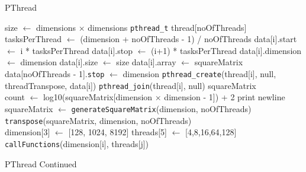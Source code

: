 \documentclass[10pt,twocolumn]{witseiepaper}
\begin{document}
\begin{appendix}
\begin{algorithm}[htbp]
\begin{algorithmic}
		\caption{PThread}
		\label{alg:3}
	\end{algorithmic}
\end{algorithm}

\begin{algorithm}[htbp]
	\begin{algorithmic}
		
		\State size $\leftarrow$ dimensions $\times$ dimensions
		\State \verb|pthread_t| thread[noOfThreads]
		\State tasksPerThread $\leftarrow$ (dimension + noOfThreads - 1) / noOfThreads
		\State data[i].start $\leftarrow$ i * tasksPerThread
		\State data[i].stop $\leftarrow$ (i+1) * tasksPerThread
		\State data[i].dimension $\leftarrow$ dimension
		\State data[i].size $\leftarrow$ size
		\State data[i].array $\leftarrow$ squareMatrix
		\EndFor
		\State data[noOfThreads - 1].\verb|stop| $\leftarrow$ dimension
		\State \verb|pthread_create|(thread[i], null, threadTranspose, data[i])
		\EndFor
		\State \verb|pthread_join|(thread[i], null)
		\EndFor
		\State \Return squareMatrix
		\EndFunction \\
		
		\State count $\leftarrow$ log10(squareMatrix[dimension $\times$ dimension - 1]) + 2
		\State print newline
		\EndIf
		\EndFor
		\EndFunction \\
		
		\State squareMatrix $\leftarrow$ \verb|generateSquareMatrix|(dimension, noOfThreads)
		\State \verb|transpose|(squareMatrix, dimension, noOfThreads)
		\EndFunction \\
		
		\State dimension[3] $\leftarrow$ [128, 1024, 8192]
		\State threads[5] $\leftarrow$ [4,8,16,64,128]
		\State \verb|callFunctions|(dimension[i], threads[j])
		\EndFor
		\EndFor
		\State {}
		\EndFunction
		
		\caption{PThread Continued}
		\label{alg:4}
	\end{algorithmic}
\end{algorithm}
		

\end{appendix}
\end{document}
